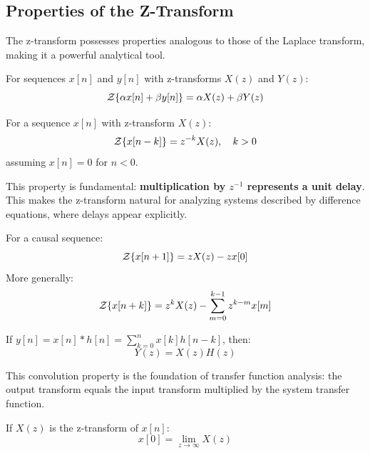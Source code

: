 \subsection{Properties of the Z-Transform}

The z-transform possesses properties analogous to those of the Laplace transform, making it a powerful analytical tool.

\begin{theorem}[Linearity]
For sequences $x[n]$ and $y[n]$ with z-transforms $X(z)$ and $Y(z)$:
\begin{equation}
\mathcal{Z}\{\alpha x[n] + \beta y[n]\} = \alpha X(z) + \beta Y(z)
\end{equation}
\end{theorem}

\begin{theorem}
For a sequence $x[n]$ with z-transform $X(z)$:
\begin{equation}
\mathcal{Z}\{x[n-k]\} = z^{-k} X(z), \quad k > 0
\end{equation}
assuming $x[n] = 0$ for $n < 0$.
\end{theorem}

This property is fundamental: \textbf{multiplication by $z^{-1}$ represents a unit delay}. This makes the z-transform natural for analyzing systems described by difference equations, where delays appear explicitly.

\begin{theorem}
For a causal sequence:
\begin{equation}
\mathcal{Z}\{x[n+1]\} = z X(z) - z x[0]
\end{equation}
More generally:
\begin{equation}
\mathcal{Z}\{x[n+k]\} = z^k X(z) - \sum_{m=0}^{k-1} z^{k-m} x[m]
\end{equation}
\end{theorem}

\begin{theorem}[Convolution]
If $y[n] = x[n] * h[n] = \sum_{k=0}^{n} x[k] h[n-k]$, then:
\begin{equation}
Y(z) = X(z) H(z)
\end{equation}
\end{theorem}

This convolution property is the foundation of transfer function analysis: the output transform equals the input transform multiplied by the system transfer function.

\begin{theorem}
If $X(z)$ is the z-transform of $x[n]$:
\begin{equation}
x[0] = \lim_{z \to \infty} X(z)
\end{equation}
\end{theorem}

